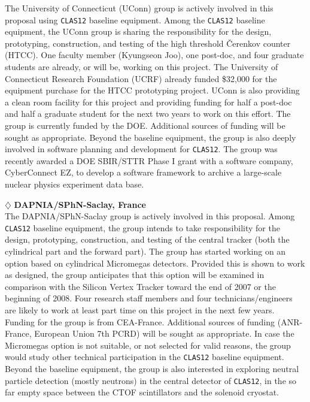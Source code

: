 \noindent
The University of Connecticut (UConn) group is actively involved in this 
proposal using {\tt CLAS12} baseline equipment.  Among the {\tt CLAS12} 
baseline equipment, the UConn group is sharing the responsibility for the 
design, prototyping, construction, and testing of the high threshold 
{\v C}erenkov counter (HTCC).  One faculty member (Kyungseon Joo), one 
post-doc, and four graduate students are already, or will be, working on 
this project.  The University of Connecticut Research Foundation (UCRF) 
already funded \$32,000 for the equipment purchase for the HTCC prototyping 
project.  UConn is also providing a clean room facility for this project and 
providing funding for half a post-doc and half a graduate student for the 
next two years to work on this effort.  The group is currently funded by the 
DOE. Additional sources of funding will be sought as appropriate.
Beyond the baseline equipment, the group is also deeply involved in software
planning and development for {\tt CLAS12}. The group was recently awarded
a DOE SBIR/STTR Phase I grant with a software company, CyberConnect EZ, to 
develop a software framework to archive a large-scale nuclear physics 
experiment data base.

\vskip 0.4cm

\noindent
$\diamondsuit$ {\bf DAPNIA/SPhN-Saclay, France} \\[0.2ex]

\noindent
The DAPNIA/SPhN-Saclay group is actively involved in this proposal.  Among 
{\tt CLAS12} baseline equipment, the group intends to take responsibility 
for the design, prototyping, construction, and testing of the central tracker 
(both the cylindrical part and the forward part). The group has started 
working on an option based on cylindrical Micromegas detectors. Provided this
is shown to work as designed, the group anticipates that this option will be 
examined in comparison with the Silicon Vertex Tracker toward the end of 2007 
or the beginning of 2008.  Four research staff members and four 
technicians/engineers are likely to work at least part time on this project 
in the next few years.  Funding for the group is from CEA-France.  Additional 
sources of funding (ANR-France, European Union 7th PCRD) will be sought as 
appropriate.  In case the Micromegas option is not suitable, or not selected 
for valid reasons, the group would study other technical participation in the 
{\tt CLAS12} baseline equipment.  Beyond the baseline equipment, the group is 
also interested in exploring neutral particle detection (mostly neutrons) in 
the central detector of {\tt CLAS12}, in the so far empty space between the 
CTOF scintillators and the solenoid cryostat.

